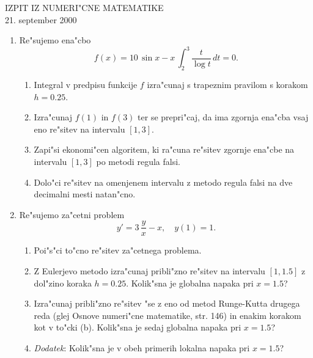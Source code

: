 \documentclass[12pt,a4paper]{article}
\begin{document}
\begin{center}
  IZPIT IZ NUMERI"CNE MATEMATIKE\\
  21. september 2000
\end{center}

\begin{enumerate}

  \item Re"sujemo ena"cbo
    $$f(x)=10\,\sin{x}-x\,\int_{2}^{3}\frac{t}{\log{t}}\,dt=0.$$
  \begin{enumerate}
   
     \item Integral v predpisu funkcije $f$ izra"cunaj s trapeznim
       pravilom s korakom $h=0.25$.

     \item Izra"cunaj $f(1)$ in $f(3)$ ter se prepri"caj, da 
       ima zgornja ena"cba vsaj eno re"sitev na intervalu
       $[1,3]$.

     \item Zapi"si ekonomi"cen algoritem, ki ra"cuna re"sitev
       zgornje ena"cbe na intervalu $[1,3]$ po metodi regula 
       falsi.

     \item Dolo"ci re"sitev na omenjenem intervalu z metodo 
       regula falsi na dve decimalni mesti natan"cno.
  \end{enumerate}

  \item Re"sujemo za"cetni problem
    $$y'=3\,\frac{y}{x}-x,\quad y(1)=1.$$

  \begin{enumerate}
    
    \item Poi"s"ci to"cno re"sitev za"cetnega problema.

    \item Z Eulerjevo metodo izra"cunaj pribli"zno re"sitev
      na intervalu $[1,1.5]$ z dol"zino koraka $h=0.25$. Kolik"sna
      je globalna napaka pri $x=1.5$?

    \item Izra"cunaj pribli"zno re"sitev "se z eno od metod 
      Runge-Kutta drugega reda (glej Osnove numeri"cne matematike, str. 146)
      in enakim korakom kot v to"cki (b). Kolik"sna je sedaj globalna 
      napaka pri $x=1.5$?

    \item {\it Dodatek}: Kolik"sna je v obeh primerih lokalna 
      napaka pri $x=1.5$?

  \end{enumerate} 
\end{enumerate}
\end{document}
